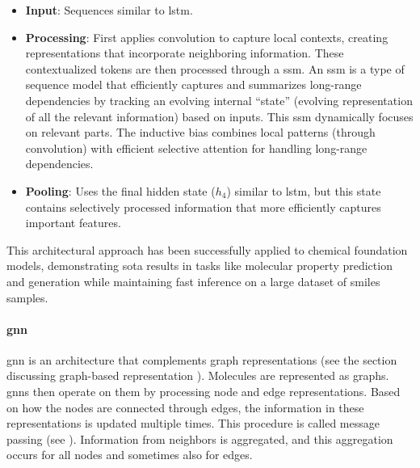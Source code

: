 \begin{itemize}
    \item \textbf{Input}:  Sequences similar to \gls{lstm}.
    \item \textbf{Processing}:  First applies convolution to capture local contexts, creating representations that incorporate neighboring information. These contextualized tokens are then processed through a \gls{ssm}. An \gls{ssm} is a type of sequence model that efficiently captures and summarizes long-range dependencies by tracking an evolving internal \enquote{state} (evolving representation of all the relevant information) based on inputs. This \gls{ssm} dynamically focuses on relevant parts. The inductive bias combines local patterns (through convolution) with efficient selective attention for handling long-range dependencies.
    \item \textbf{Pooling}:  Uses the final hidden state ($h_{4}$) similar to \gls{lstm}, but this state contains selectively processed information that more efficiently captures important features.
\end{itemize}
This architectural approach has been successfully applied to chemical foundation models, demonstrating \gls{sota} results in tasks like molecular property prediction and generation while maintaining fast inference on a large dataset of \gls{smiles} samples.\autocite{soares2025mamba-based} 



\paragraph{\gls{gnn}}
\gls{gnn} is an architecture that complements graph representations (see the section discussing graph-based representation ). Molecules are represented as graphs. \glspl{gnn} then operate on them by processing node and edge representations. Based on how the nodes are connected through edges, the information in these representations is updated multiple times. This procedure is called message passing (see ). Information from neighbors is aggregated, and this aggregation occurs for all nodes and sometimes also for edges.

